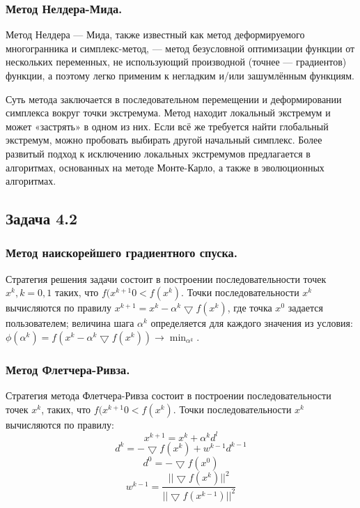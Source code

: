 \documentclass[a4paper, 12pt]{article}   	%
\begin{document}
\subsubsection{Метод Нелдера-Мида.}
    Метод Нелдера — Мида, также известный как метод деформируемого многогранника и симплекс-метод, — метод безусловной оптимизации функции от нескольких переменных, не использующий производной (точнее — градиентов) функции, а поэтому легко применим к негладким и/или зашумлённым функциям.

    Суть метода заключается в последовательном перемещении и деформировании симплекса вокруг точки экстремума. Метод находит локальный экстремум и может «застрять» в одном из них. Если всё же требуется найти глобальный экстремум, можно пробовать выбирать другой начальный симплекс. Более развитый подход к исключению локальных экстремумов предлагается в алгоритмах, основанных на методе Монте-Карло, а также в эволюционных алгоритмах.
    
\subsection{Задача 4.2}

\subsubsection{Метод наискорейшего градиентного спуска.}
    Стратегия решения задачи состоит в построении последовательности точек $x^k, k=0, 1$ таких, что $f(x^{k+1}0 < f(x^k)$. Точки последовательности ${x^k}$  вычисляются по правилу  $x^{k+1} = x^k - \alpha ^k \bigtriangledown f(x^k)$, где точка $x^0$ задается пользователем; величина шага $\alpha ^k$ определяется для каждого значения  из условия: $\phi (\alpha ^k) = f(x^k - \alpha ^ k \bigtriangledown f(x^k)) \rightarrow \min_{\alpha ^ k}$.

\subsubsection{Метод Флетчера-Ривза.}
    Стратегия метода Флетчера-Ривза состоит в построении последовательности точек ${x^k}$, таких, что $f(x^{k+1}0 < f(x^k)$. Точки последовательности ${x^k}$ вычисляются по правилу:
    \begin{equation}
        x^{k+1} = x^k + \alpha ^k d^l
    \end{equation}
    \begin{equation}
        d ^k = - \bigtriangledown f(x^k) + w ^ {k-1} d ^{k-1}
    \end{equation}
    \begin{equation}
        d^0 = - \bigtriangledown f(x^0)
    \end{equation}
    \begin{equation}
        w^{k-1} = \frac{|| \bigtriangledown f(x^k)||^2}{|| \bigtriangledown f(x^{k-1})||^2}
    \end{equation}
    
\end{document}
